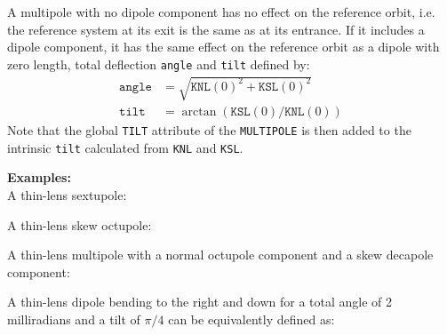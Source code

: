 A multipole with no dipole component has no effect on the reference
orbit, i.e. the reference system at its exit is the same as at its
entrance. If it includes a dipole component, it has the same effect on
the reference orbit as a dipole with zero length, total deflection 
\texttt{angle} and \texttt{tilt} defined by:
\begin{equation}
  \begin{aligned}
    \mathtt{angle} &= \sqrt{ \mathtt{KNL}(0)^2 + \mathtt{KSL}(0)^2 }\\
    \mathtt{tilt}  &= \arctan (\mathtt{KSL}(0) / \mathtt{KNL}(0))  
  \end{aligned}
\end{equation}
Note that the global \texttt{TILT} attribute of the \texttt{MULTIPOLE}
is then added to the intrinsic \texttt{tilt} calculated from
\texttt{KNL} and \texttt{KSL}. 



\textbf{Examples:}\\
A thin-lens sextupole:  

A thin-lens skew octupole:  

A thin-lens multipole with a normal octupole component and a skew decapole
component:

A thin-lens dipole bending to the right and down for a total angle of
2 milliradians and a tilt of $\pi/4$ can be equivalently defined as:






